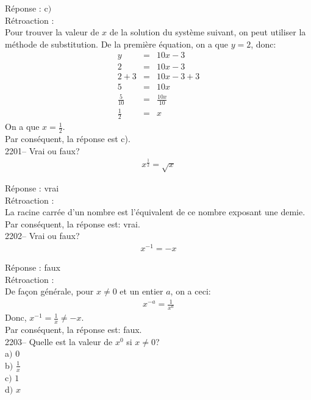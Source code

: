 \documentclass[letterpaper, 12pt]{article}
\begin{document}
R\'eponse : c$)$\\

R\'etroaction :\\
Pour trouver la valeur de $x$ de la solution du syst\`eme suivant, on peut utiliser la m\'ethode de substitution. De la premi\`ere \'equation, on a que $y=2$, donc:
\begin{eqnarray*}
 y&=&10x-3\\
 2&=&10x-3\\
 2+3&=&10x-3+3\\
 5&=&10x\\[2mm]
 \frac{5}{10}&=&\frac{10x}{10}\\[2mm]
\frac{1}{2}&=&x
\end{eqnarray*}
On a que $x=\frac{1}{2}$.\\
Par cons\'equent, la r\'eponse est c).\\

2201-- Vrai ou faux?
\begin{eqnarray*}
 x^{\frac{1}{2}}=\sqrt{x}
\end{eqnarray*}

R\'eponse : vrai\\

R\'etroaction :\\
La racine carr\'ee d'un nombre est l'\'equivalent de ce nombre exposant une demie.\\
Par cons\'equent, la r\'eponse est: vrai.\\


2202-- Vrai ou faux?
\begin{eqnarray*}
 x^{-1}=-x
\end{eqnarray*}

R\'eponse : faux\\

R\'etroaction :\\
De fa\c con g\'en\'erale, pour $x\neq0$ et un entier $a$, on a ceci:
\begin{eqnarray*}
 x^{-a}=\frac{1}{x^{a}}
\end{eqnarray*}
Donc, $x^{-1}=\frac{1}{x}\neq-x$.\\
Par cons\'equent, la r\'eponse est: faux.\\

2203-- Quelle est la valeur de $x^{0}$ si $x\neq0$?\\

a$)$ $0$\\[2mm]
b$)$ $\frac{1}{x}$\\[2mm]
c$)$ $1$\\[2mm]
d$)$ $x$\\
\end{document}
